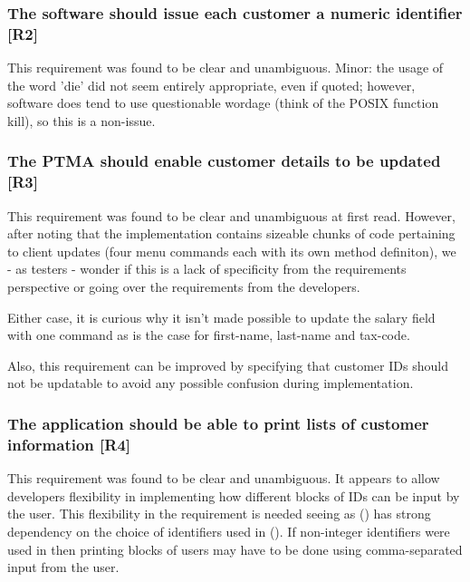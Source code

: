 \subsubsection{The software should issue each customer a numeric identifier [R2]}
This requirement was found to be clear and unambiguous. 
Minor: the usage of the word 'die' did not seem entirely appropriate, even if quoted; however, software does tend to use questionable wordage (think of the POSIX function kill), so this is a non-issue.  

\subsubsection{The PTMA should enable customer details to be updated [R3]}
This requirement was found to be clear and unambiguous at first read. 
However, after noting that the implementation contains sizeable chunks of code pertaining to client updates (four menu commands each with its own method definiton), we - as testers - wonder if this is a lack of specificity from the requirements perspective or going over the requirements from the developers. 
\par
Either case, it is curious why it isn't made possible to update the salary field with one command as is the case for first-name, last-name and tax-code.  
\par
Also, this requirement can be improved by specifying that customer IDs should not be updatable to avoid any possible confusion during implementation. 

\subsubsection{The application should be able to print lists of customer information [R4]}
This requirement was found to be clear and unambiguous. 
It appears to allow developers flexibility in implementing how different blocks of IDs can be input by the user. This flexibility in the requirement is needed seeing as (\RFour) has strong dependency on the choice of identifiers used in (\RTwo). If non-integer identifiers were used in \RTwo \space then printing blocks of users may have to be done using comma-separated input from the user. 

